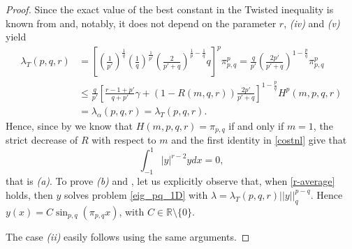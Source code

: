 \documentclass{amsart}
\theoremstyle{definition}
\theoremstyle{remark}
\newcommand{\R}{\mathbb{R}}
\begin{document}
\begin{proof} Since the exact value of the best constant in the Twisted inequality is known from \cite[Thm. 1.1]{CD} and, notably, it does not depend on the parameter $r$, \textit{(iv)} and \textit{(v)} yield
\begin{equation}
\label{vero_twisted}
\begin{split}%
\lambda_T(p,q,r) &= \left[ \left(\frac 1 {p'}\right)^\frac 1q\left(\frac 1q \right)^{\frac 1 {p'}}\left(\frac 2 {p'+q}\right)^{\frac 1p-\frac 1q}q \right]^p\pi_{p,q}^p=\frac {q}{p'}\left(\frac {2p'} {p'+q}\right)^{1-\frac pq} \pi_{p,q}^p\\
&\leq \frac q {p' }\left[\frac{r-1+p'}{q+p'}\gamma+(1-R(m,q,r))\frac{2p'}{p'+q}\right]^{1-\frac p q}H^p\left(m,p,q,r\right)\\
&= \lambda_\alpha(p,q,r)= \lambda_T(p,q,r).
\end{split}
 \end{equation}
Hence, since by  we know that $H\left(m,p,q,r \right)=\pi_{p,q}$ if and only if $m=1$, the strict  decrease of $R$ with respect to $m$ and the first identity in \eqref{costnl} give that 
\begin{equation}
\label{r-average}
\int_{-1}^{1} |y|^{r-2}ydx=0,
\end{equation}
that is \textit{(a)}. To prove \textit{(b)} and , let us explicitly observe that, when \eqref{r-average} holds, then $y$ solves problem \eqref{eig_pq_1D} with $\lambda=\lambda_T(p,q,r) ||y||_q^{p-q}$. Hence $y(x)=C\sin_{p,q} (\pi_{p,q} x)$, with $C\in \R\setminus\{0\}$.  

The case {\it (ii)} easily follows using the same arguments.
\end{proof}
\end{document}
